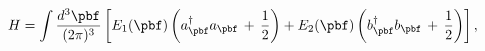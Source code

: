 \begin{equation}
H = \int \frac{d^{3}{\pbf}}{(2\pi)^3} \left[E_1(\pbf) \left(
a^{\dagger}_{\pbf} a_{\pbf} \,+\,\frac{1}{2}\right)
+ E_2(\pbf) \left(b^{\dagger}_{\pbf} b_{\pbf} 
\,+\,\frac{1}{2}\right)\right],
\label{Hab}
\end{equation}

